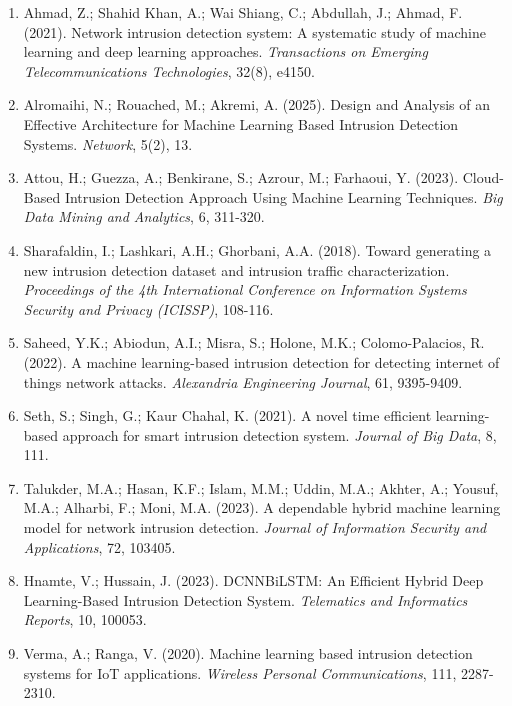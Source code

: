 \documentclass[12pt,a4paper]{report}
\begin{document}
\begin{enumerate}

\item Ahmad, Z.; Shahid Khan, A.; Wai Shiang, C.; Abdullah, J.; Ahmad, F. (2021). Network intrusion detection system: A systematic study of machine learning and deep learning approaches. \textit{Transactions on Emerging Telecommunications Technologies}, 32(8), e4150.

\item Alromaihi, N.; Rouached, M.; Akremi, A. (2025). Design and Analysis of an Effective Architecture for Machine Learning Based Intrusion Detection Systems. \textit{Network}, 5(2), 13.

\item Attou, H.; Guezza, A.; Benkirane, S.; Azrour, M.; Farhaoui, Y. (2023). Cloud-Based Intrusion Detection Approach Using Machine Learning Techniques. \textit{Big Data Mining and Analytics}, 6, 311-320.

\item Sharafaldin, I.; Lashkari, A.H.; Ghorbani, A.A. (2018). Toward generating a new intrusion detection dataset and intrusion traffic characterization. \textit{Proceedings of the 4th International Conference on Information Systems Security and Privacy (ICISSP)}, 108-116.

\item Saheed, Y.K.; Abiodun, A.I.; Misra, S.; Holone, M.K.; Colomo-Palacios, R. (2022). A machine learning-based intrusion detection for detecting internet of things network attacks. \textit{Alexandria Engineering Journal}, 61, 9395-9409.

\item Seth, S.; Singh, G.; Kaur Chahal, K. (2021). A novel time efficient learning-based approach for smart intrusion detection system. \textit{Journal of Big Data}, 8, 111.

\item Talukder, M.A.; Hasan, K.F.; Islam, M.M.; Uddin, M.A.; Akhter, A.; Yousuf, M.A.; Alharbi, F.; Moni, M.A. (2023). A dependable hybrid machine learning model for network intrusion detection. \textit{Journal of Information Security and Applications}, 72, 103405.

\item Hnamte, V.; Hussain, J. (2023). DCNNBiLSTM: An Efficient Hybrid Deep Learning-Based Intrusion Detection System. \textit{Telematics and Informatics Reports}, 10, 100053.

\item Verma, A.; Ranga, V. (2020). Machine learning based intrusion detection systems for IoT applications. \textit{Wireless Personal Communications}, 111, 2287-2310.


\end{enumerate}
\end{document}

